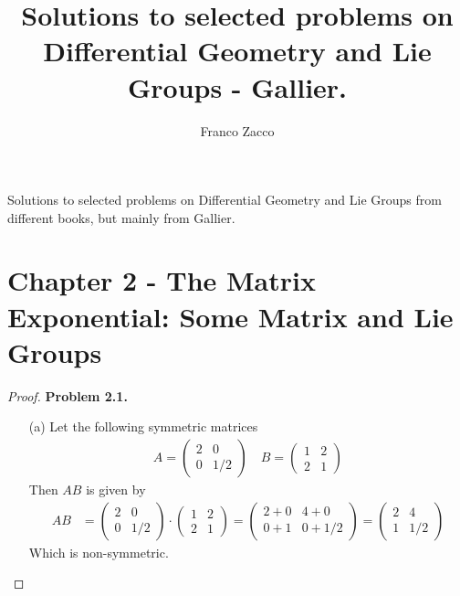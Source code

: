 \documentclass[11pt]{article}
\title{\textbf{
    Solutions to selected problems on Differential Geometry and Lie Groups
    - Gallier.
}}
\author{Franco Zacco}
\date{}
\theoremstyle{definition}
\begin{document}
\maketitle
\thispagestyle{empty}

Solutions to selected problems on Differential Geometry and Lie Groups from
different books, but mainly from Gallier.
\section*{Chapter 2 - The Matrix Exponential: Some Matrix and Lie Groups}

\begin{proof}{\textbf{Problem 2.1.}}
\begin{itemize}
    \item [(a)] Let the following symmetric matrices
    \begin{align*}
        A = \begin{pmatrix}
            2 & 0\\
            0 & 1/2
        \end{pmatrix}
        \quad
        B = \begin{pmatrix}
            1 & 2\\
            2 & 1
        \end{pmatrix}
    \end{align*}
    Then $AB$ is given by
    \begin{align*}
        AB &= \begin{pmatrix}
            2 & 0\\
            0 & 1/2
        \end{pmatrix}
        \cdot
        \begin{pmatrix}
            1 & 2\\
            2 & 1
        \end{pmatrix}
        = \begin{pmatrix}
            2 + 0 & 4 + 0\\
            0 + 1 & 0 + 1/2
        \end{pmatrix}
        = \begin{pmatrix}
            2 & 4\\
            1 & 1/2
        \end{pmatrix}
    \end{align*}
    Which is non-symmetric.


\end{itemize}
\end{proof}
\end{document}
